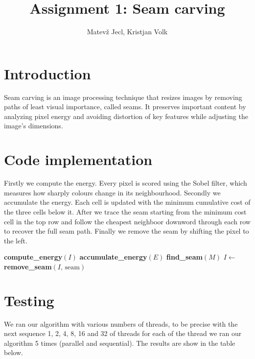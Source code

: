 \documentclass[9pt,onecolumn]{IEEEtran}
\title{\vspace{0ex} Assignment 1: Seam carving}
\author{Matevž Jecl, Kristjan Volk\vspace{-4.0ex}}
\begin{document}
\maketitle
\markboth{}{}
\thispagestyle{plain}
\section{\textbf{Introduction}}
Seam carving is an image processing technique that resizes images by removing  paths of least visual importance, called seams. It preserves important content by analyzing pixel energy and avoiding distortion of key features while adjusting the image’s dimensions.

\section{\textbf{Code implementation}}
Firstly we compute the energy. Every pixel is scored using the Sobel filter, which measures how sharply colours change in its neighbourhood. Secondly we accumulate the energy. Each cell is updated with the minimum cumulative cost of the three cells below it. After we trace the seam starting from the minimum cost cell in the top row and follow the cheapest neighboor downword through each row to recover the full seam path. Finally we remove the seam by shifting the pixel to the left.
\begin{algorithm}[H]
\caption{Seam Carving --- Main Loop}
\begin{algorithmic}[1]
    \State \textbf{compute\_energy}$(I)$ 
    \State \textbf{accumulate\_energy}$(E)$ 
    \State \textbf{find\_seam}$(M)$ 
    \State $I \leftarrow$ \textbf{remove\_seam}$(I,\, \text{seam})$ 
\EndFor
\end{algorithmic}
\end{algorithm}
\pagestyle{plain}
\section{\textbf{Testing}}
We ran our algorithm with various numbers of threads, to be precise with the next sequence 1, 2, 4, 8, 16 and 32 of threads for each of the thread we ran our algorithm 5 times (parallel and sequential). The results are show in the table below.
\end{document}
